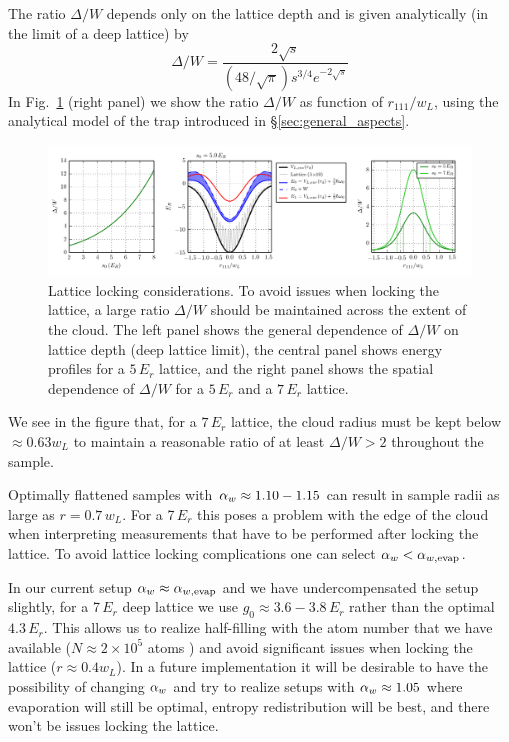 The ratio $\Delta/W$ depends only on the lattice depth and is given
analytically (in the limit of a deep lattice) by
\begin{equation} 
  \Delta/W =  \frac{  2\sqrt{s} }{ (48/\sqrt{\pi}) s^{3/4} e^{-2\sqrt{s} }} 
\end{equation}
In Fig.~\ref{fig:lattice_lock_constraints} (right panel) we show the ratio
$\Delta/W$ as function of $r_{111}/w_{L}$,  using the analytical model of the trap
introduced in \S\ref{sec:general_aspects}. 
\begin{figure}
    \centering
\includegraphics[width=\textwidth]{../figures/lda_evap/lattice_lock_constraint_gaps_5Er_50um_0Er_40um.png}
\caption{\small Lattice locking considerations. To avoid issues when locking the
lattice, a large ratio $\Delta/W$ should be maintained across the extent of the
cloud. The left panel shows the general dependence of $\Delta/W$ on lattice
depth (deep lattice limit), the central panel shows energy profiles for a
$5\,E_{r}$ lattice, and the right panel shows the spatial dependence of
$\Delta/W$ for a $5\,E_{r}$ and a $7\,E_{r}$ lattice. }
    \label{fig:lattice_lock_constraints}
\end{figure}
We see in the figure that, for a $7\,E_{r}$ lattice,  the cloud radius must be
kept below $\approx 0.63 w_{L}$ to maintain a reasonable ratio of at least
$\Delta/W > 2$ throughout the sample.

Optimally flattened samples with $ \alpha_{w} \approx 1.10-1.15$ can result in
sample radii as large as $r=0.7\,w_{L}$.  For a 7\,$E_{r}$ this poses a problem
with the edge of the cloud when interpreting measurements that have to be
performed after locking the lattice. To avoid lattice locking complications one
can select $ \alpha_{w}  <  \alpha_{w,\text{evap}} $.

In our current setup $ \alpha_{w}  \approx  \alpha_{w,\text{evap}} $ and we have undercompensated
the setup slightly, for a 7\,$E_{r}$ deep lattice we use $g_{0}\approx
3.6-3.8\,E_{r}$ rather than the optimal $4.3\,E_{r}$.  This allows us to
realize half-filling with the atom number that we have available ($N\approx
2\times 10^{5}$ atoms ) and avoid significant issues when locking the lattice
($r\approx 0.4 w_{L}$).  In a future implementation it will be desirable to
have the possibility of changing $ \alpha_{w} $ and try to realize setups with
$ \alpha_{w}  \approx 1.05$ where evaporation will still be optimal, entropy
redistribution will be best, and there won't be issues locking the lattice.  


